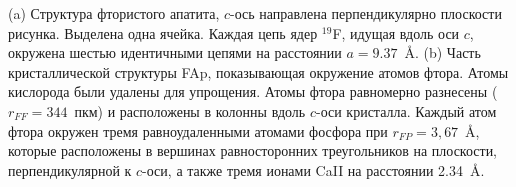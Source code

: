 (a) Структура фтористого апатита, $c$-ось направлена перпендикулярно плоскости рисунка.
Выделена одна ячейка.
Каждая цепь ядер $^{19}$F, идущая вдоль оси $c$, окружена шестью идентичными цепями на расстоянии $a=9.37$~\r{A}.
(b) Часть кристаллической структуры FAp, показывающая окружение атомов фтора. Атомы кислорода были удалены для упрощения.
Атомы фтора равномерно разнесены ($r_{FF}=344$~пкм) и расположены в колонны вдоль $c$-оси кристалла.
Каждый атом фтора окружен тремя равноудаленными атомами фосфора при $r_{FP}=3,67$~\r{A},
которые расположены в вершинах равносторонних треугольников на плоскости,
перпендикулярной к $c$-оси, а также тремя ионами CaII на расстоянии 2.34~\r{A}.
